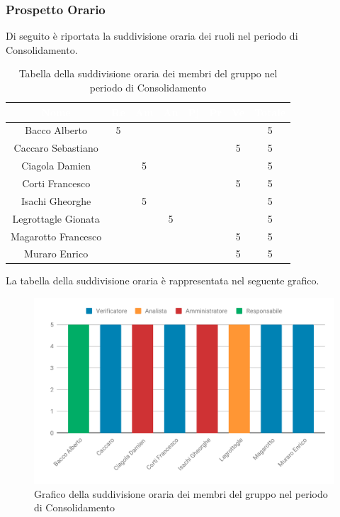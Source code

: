 \subsubsection{Prospetto Orario}
Di seguito è riportata la suddivisione oraria dei ruoli nel periodo di Consolidamento.




\begin{table}[H]	
	\begin{center}
	    \begin{tabular}{cccccccc}
	  		
			\rowcolor{greySWEight}
			\textcolor{white}{\textbf{Nome}} & \textcolor{white}{\textbf{Re}} & \textcolor{white}{\textbf{Am}} & \textcolor{white}{\textbf{An}} & \textcolor{white}{\textbf{Pj}} & \textcolor{white}{\textbf{Pr}} & \textcolor{white}{\textbf{Ve}} & \textcolor{white}{\textbf{Totale}}
			\\ \hline
			Bacco Alberto & 5 & & & & & & 5 \\
			Caccaro Sebastiano & & & & & & 5 & 5 \\
			Ciagola Damien & & 5 & & & & & 5 \\
			Corti Francesco & & & & & & 5 & 5 \\
			Isachi Gheorghe & & 5 & & & & & 5 \\
			Legrottagle Gionata & & & 5 & & & & 5 \\
			Magarotto Francesco & & & & & & 5 & 5 \\
			Muraro Enrico & & & & & & 5 & 5 \\

			\end{tabular}
	    \caption{Tabella della suddivisione oraria dei membri del gruppo nel periodo di Consolidamento} \label{tab:tabellaPersoneConsolidamento} 
	\end{center}
\end{table}

La tabella della suddivisione oraria è rappresentata nel seguente grafico.
\begin{figure}[H]
	\includegraphics[width=1\linewidth]{Preventivo/grafici/CO1.pdf}
	\caption{Grafico della suddivisione oraria dei membri del gruppo nel periodo di Consolidamento}
\end{figure}

